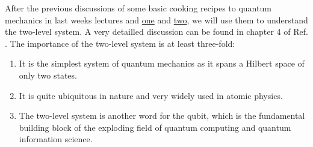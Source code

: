 After the previous discussions of some basic cooking recipes to quantum mechanics in last weeks lectures \cite{Jendrzejewskia} and \cite{Jendrzejewski}\href{https://www.authorea.com/326007/wyOpqBcLPiiNhswBbwDHbA}{one} and \cite{Jendrzejewski}\href{https://www.authorea.com/326176/zpAQ6kYxFdvu3rOmqKYROA}{two}, we will use them to understand the two-level system. A very detailled discussion can be found in chapter 4 of Ref. \cite{1}. The importance of the two-level system is at least three-fold:
\begin{enumerate}
\item It is the simplest system of quantum mechanics as it spans a Hilbert space of only two states.
\item It is quite ubiquitous in nature and very widely used in atomic physics.
\item The two-level system is another word for the qubit, which is the fundamental building block of the exploding field of quantum computing and quantum information science.
\end{enumerate}

